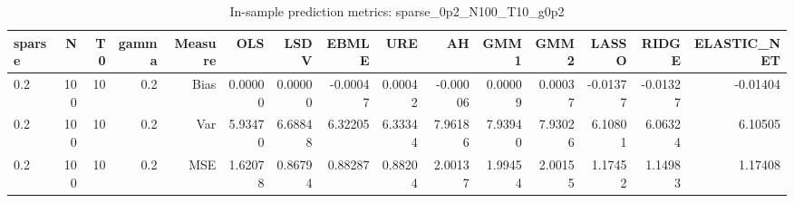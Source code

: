 \begin{table}[!htbp]\centering
\caption{In-sample prediction metrics: sparse_0p2_N100_T10_g0p2}
\label{tab:table2_sparse_0p2_N100_T10_g0p2}
\begin{tabular}{lrrrrrrrrrrrrrr}
\hline
sparse & N & T0 & gamma & Measure & OLS & LSDV & EBMLE & URE & AH & GMM1 & GMM2 & LASSO & RIDGE & ELASTIC_NET \\
\hline
0.2 & 100 & 10 & 0.2 & Bias & 0.00000 & 0.00000 & -0.00047 & 0.00042 & -0.00006 & 0.00009 & 0.00037 & -0.01377 & -0.01327 & -0.01404 \\
0.2 & 100 & 10 & 0.2 & Var & 5.93470 & 6.68848 & 6.32205 & 6.33344 & 7.96186 & 7.93940 & 7.93026 & 6.10801 & 6.06324 & 6.10505 \\
0.2 & 100 & 10 & 0.2 & MSE & 1.62078 & 0.86794 & 0.88287 & 0.88204 & 2.00137 & 1.99454 & 2.00155 & 1.17452 & 1.14983 & 1.17408 \\
\hline
\end{tabular}
\end{table}

